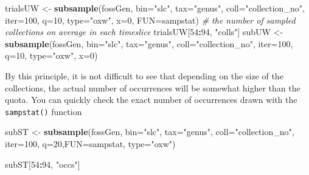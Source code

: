 \documentclass[]{article}
\newenvironment{Shaded}{\begin{snugshade}}{\end{snugshade}}
\newcommand{\CommentTok}[1]{\textcolor[rgb]{0.56,0.35,0.01}{\textit{#1}}}
\newcommand{\DataTypeTok}[1]{\textcolor[rgb]{0.13,0.29,0.53}{#1}}
\newcommand{\DecValTok}[1]{\textcolor[rgb]{0.00,0.00,0.81}{#1}}
\newcommand{\KeywordTok}[1]{\textcolor[rgb]{0.13,0.29,0.53}{\textbf{#1}}}
\newcommand{\NormalTok}[1]{#1}
\newcommand{\OperatorTok}[1]{\textcolor[rgb]{0.81,0.36,0.00}{\textbf{#1}}}
\newcommand{\StringTok}[1]{\textcolor[rgb]{0.31,0.60,0.02}{#1}}
\begin{document}
\begin{Shaded}
\begin{Highlighting}[]
\NormalTok{trialsUW <-}\StringTok{ }\KeywordTok{subsample}\NormalTok{(fossGen, }\DataTypeTok{bin=}\StringTok{"slc"}\NormalTok{, }\DataTypeTok{tax=}\StringTok{"genus"}\NormalTok{, }\DataTypeTok{coll=}\StringTok{"collection_no"}\NormalTok{,}
  \DataTypeTok{iter=}\DecValTok{100}\NormalTok{, }\DataTypeTok{q=}\DecValTok{10}\NormalTok{, }\DataTypeTok{type=}\StringTok{"oxw"}\NormalTok{, }\DataTypeTok{x=}\DecValTok{0}\NormalTok{, }\DataTypeTok{FUN=}\NormalTok{sampstat)}
\CommentTok{# the number of sampled collections on average in each timeslice}
\NormalTok{trialsUW[}\DecValTok{54}\OperatorTok{:}\DecValTok{94}\NormalTok{, }\StringTok{"colls"}\NormalTok{]}
\NormalTok{subUW <-}\StringTok{ }\KeywordTok{subsample}\NormalTok{(fossGen, }\DataTypeTok{bin=}\StringTok{"slc"}\NormalTok{, }\DataTypeTok{tax=}\StringTok{"genus"}\NormalTok{, }\DataTypeTok{coll=}\StringTok{"collection_no"}\NormalTok{,}
  \DataTypeTok{iter=}\DecValTok{100}\NormalTok{, }\DataTypeTok{q=}\DecValTok{10}\NormalTok{, }\DataTypeTok{type=}\StringTok{"oxw"}\NormalTok{, }\DataTypeTok{x=}\DecValTok{0}\NormalTok{)}
\end{Highlighting}
\end{Shaded}

By this principle, it is not difficult to see that depending on the size
of the collections, the actual number of occurrences will be somewhat
higher than the quota. You can quickly check the exact number of
occurrences drawn with the \texttt{sampstat()} function

\begin{Shaded}
\begin{Highlighting}[]
\NormalTok{subST <-}\StringTok{ }\KeywordTok{subsample}\NormalTok{(fossGen, }\DataTypeTok{bin=}\StringTok{"slc"}\NormalTok{, }\DataTypeTok{tax=}\StringTok{"genus"}\NormalTok{, }\DataTypeTok{coll=}\StringTok{"collection_no"}\NormalTok{, }
  \DataTypeTok{iter=}\DecValTok{100}\NormalTok{, }\DataTypeTok{q=}\DecValTok{20}\NormalTok{,}\DataTypeTok{FUN=}\NormalTok{sampstat, }\DataTypeTok{type=}\StringTok{"oxw"}\NormalTok{)}
\end{Highlighting}
\end{Shaded}

\begin{Shaded}
\begin{Highlighting}[]
\NormalTok{subST[}\DecValTok{54}\OperatorTok{:}\DecValTok{94}\NormalTok{, }\StringTok{"occs"}\NormalTok{]}
\end{Highlighting}
\end{Shaded}
\end{document}
